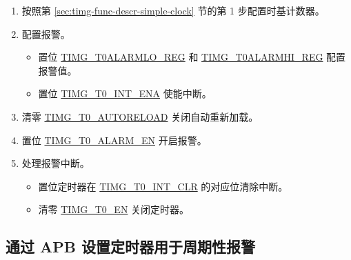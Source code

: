 \documentclass[main\_\_CN.tex]{subfiles}
\begin{document}
\begin{enumerate}
    \item 按照第 \ref{sec:timg-func-descr-simple-clock} 节的第 1 步配置时基计数器。
    \item 配置报警。
    \begin{itemize}
        \item 置位 \hyperref[regdesc:TIMGTXALARMLOREG]{TIMG\_T0ALARMLO\_REG} 和 \hyperref[regdesc:TIMGTXALARMHIREG]{TIMG\_T0ALARMHI\_REG} 配置报警值。
        \item 置位 \hyperref[fielddesc:TIMGT0INTENA]{TIMG\_T0\_INT\_ENA} 使能中断。
    \end{itemize}
    \item 清零 \hyperref[fielddesc:TIMGTXAUTORELOAD]{TIMG\_T0\_AUTORELOAD} 关闭自动重新加载。
    \item 置位 \hyperref[fielddesc:TIMGTXALARMEN]{TIMG\_T0\_ALARM\_EN} 开启报警。
    \item 处理报警中断。
    \begin{itemize}
        \item 置位定时器在 \hyperref[fielddesc:TIMGT0INTCLR]{TIMG\_T0\_INT\_CLR} 的对应位清除中断。
        \item 清零 \hyperref[fielddesc:TIMGTXEN]{TIMG\_T0\_EN} 关闭定时器。
    \end{itemize}
\end{enumerate}

\subsection{通过 APB 设置定时器用于周期性报警}
\end{document}
